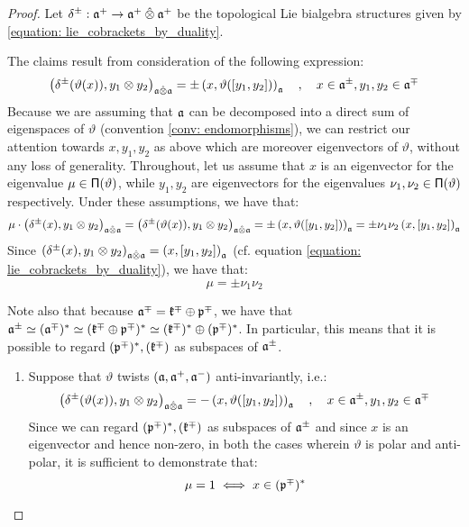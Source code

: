             \begin{proof}
                Let $\delta^{\pm}: \a^+ \to \a^+ \hattensor \a^+$ be the topological Lie bialgebra structures given by \eqref{equation: lie_cobrackets_by_duality}.
            
                The claims result from consideration of the following expression:
                    $$\left( \delta^{\pm}( \vartheta(x) ), y_1 \tensor y_2 \right)_{\a \hattensor \a} = \pm \left( x, \vartheta( [y_1, y_2] ) \right)_{\a} \quad, \quad x \in \a^{\pm}, y_1, y_2 \in \a^{\mp}$$
                Because we are assuming that $\mathfrak{a}$ can be decomposed into a direct sum of eigenspaces of $\vartheta$ (convention \ref{conv: endomorphisms}), we can restrict our attention towards $x, y_1, y_2$ as above which are moreover eigenvectors of $\vartheta$, without any loss of generality. Throughout, let us assume that $x$ is an eigenvector for the eigenvalue $\mu \in \mathsf{\Pi}(\vartheta)$, while $y_1, y_2$ are eigenvectors for the eigenvalues $\nu_1, \nu_2 \in \mathsf{\Pi}(\vartheta)$ respectively. Under these assumptions, we have that:
                    $$\mu \cdot \left( \delta^{\pm}( x ), y_1 \tensor y_2 \right)_{\a \hattensor \a} = \left( \delta^{\pm}( \vartheta(x) ), y_1 \tensor y_2 \right)_{\a \hattensor \a} = \pm \left( x, \vartheta( [y_1, y_2] ) \right)_{\a} = \pm \nu_1 \nu_2 \left( x, [y_1, y_2] \right)_{\a}$$
                Since $\left( \delta^{\pm}( x ), y_1 \tensor y_2 \right)_{\a \hattensor \a} = \left( x, [y_1, y_2] \right)_{\a}$ (cf. equation \eqref{equation: lie_cobrackets_by_duality}), we have that:
                    $$\mu = \pm \nu_1 \nu_2$$
                
                Note also that because $\mathfrak{a}^{\mp} = \mathfrak{k}^{\mp} \oplus \mathfrak{p}^{\mp}$, we have that $\mathfrak{a}^{\pm} \simeq (\mathfrak{a}^{\mp})^* \simeq (\mathfrak{k}^{\mp} \oplus \mathfrak{p}^{\mp})^* \simeq (\mathfrak{k}^{\mp})^* \oplus (\mathfrak{p}^{\mp})^*$. In particular, this means that it is possible to regard $(\mathfrak{p}^{\mp})^*, (\mathfrak{k}^{\mp})$ as subspaces of $\mathfrak{a}^{\pm}$. 
                \begin{enumerate}
                    \item Suppose that $\vartheta$ twists $(\mathfrak{a}, \mathfrak{a}^+, \mathfrak{a}^-)$ anti-invariantly, i.e.:
                        $$\left( \delta^{\pm}( \vartheta(x) ), y_1 \tensor y_2 \right)_{\a \hattensor \a} = -\left( x, \vartheta( [y_1, y_2] ) \right)_{\a} \quad, \quad x \in \a^{\pm}, y_1, y_2 \in \a^{\mp}$$
                    Since we can regard $(\mathfrak{p}^{\mp})^*, (\mathfrak{k}^{\mp})$ as subspaces of $\mathfrak{a}^{\pm}$ and since $x$ is an eigenvector and hence non-zero, in both the cases wherein $\vartheta$ is polar and anti-polar, it is sufficient to demonstrate that:
                        $$\mu = 1 \iff x \in (\mathfrak{p}^{\mp})^*$$
                        

\end{enumerate}
\end{proof}
